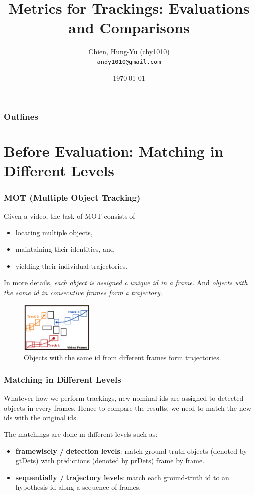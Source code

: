 \documentclass[slidetop, mathserif]{beamer}
\title[Metrics for Tracking]{Metrics for Trackings: Evaluations and Comparisons}
\author[chy1010]{Chien, Hung-Yu (chy1010) \\ {\tt andy1010@gmail.com}}
\date{\today}
\begin{document}
\frame{\titlepage}

\section[Outline]{}
\begin{frame}
    \frametitle{Outlines}
    \tableofcontents
\end{frame}

\section{Before Evaluation: Matching in Different Levels}

\begin{frame}
	\frametitle{MOT (Multiple Object Tracking)}
	
	Given a video, the task of MOT consists of 
	\begin{itemize}
		\item locating multiple objects,
		\item maintaining their identities, and
		\item yielding their individual trajectories.
	\end{itemize}
	
	In more details, \emph{each object is assigned a unique id in a frame.}
	And \emph{objects with the same id in consecutive frames form a trajectory}.
	
	\begin{figure}
		\includegraphics[height=70pt]{pics/fig1.png}
		\caption{Objects with the same id from different frames form trajectories.}
	\end{figure}
	
\end{frame}

\begin{frame}
	\frametitle{Matching in Different Levels}
	
	Whatever how we perform trackings,
	new nominal ids are assigned to detected objects in every frames.
	Hence to compare the results, we need to match the new ids
	with the original ids.

	\quad
	
	The matchings are done in different levels such as:
	\begin{itemize}
		\item {\bf framewisely / detection levels}:
		      match ground-truth objects (denoted by gtDets)
		      with predictions (denoted by prDets) frame by frame.
		\item {\bf sequentially / trajectory levels}:
		      match each ground-truth id to an hypothesis id along a sequence of frames.
	\end{itemize}
	
\end{frame}
\end{document}
